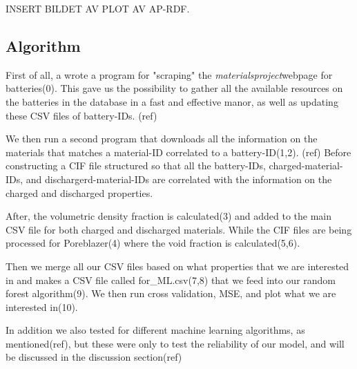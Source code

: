 INSERT BILDET AV PLOT AV AP-RDF. 

\subsection{Algorithm}

First of all, a wrote a program for "scraping" the \textit{materialsproject}webpage for batteries(0). This gave us the possibility to gather all the available resources on the batteries in the database in a fast and effective manor, as well as updating these CSV files of  battery-IDs. (ref)

We then run a second program that downloads all the information on the materials that matches a material-ID correlated to a battery-ID(1,2). (ref) Before constructing a CIF file structured so that all the battery-IDs, charged-material-IDs, and dischargerd-material-IDs are correlated with the information on the charged and discharged properties. 

After, the volumetric density fraction is calculated(3) and added to the main CSV file for both charged and discharged materials. While the CIF files are being processed for Poreblazer(4) where the void fraction is calculated(5,6). 

Then we merge all our CSV files based on what properties that we are interested in and makes a CSV file called for\_ML.csv(7,8) that we feed into our random forest algorithm(9). We then run cross validation, MSE, and plot what we are interested in(10).

In addition we also tested for different machine learning algorithms, as mentioned(ref), but these were only to test the reliability of our model, and will be discussed in the discussion section(ref) 





